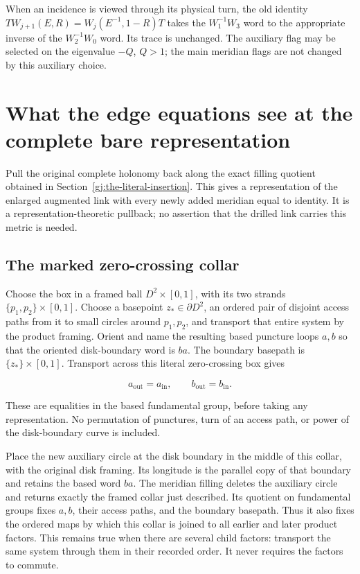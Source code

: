 When an incidence is viewed through its physical turn, the old identity
\(T W_{j+1}(E,R)=W_j(E^{-1},1-R)T\)
takes the \(W_1^{-1}W_3\) word to the appropriate inverse of the \(W_2^{-1}W_0\) word. Its trace is unchanged. The auxiliary flag may be selected on the eigenvalue \(-Q\), \(Q>1\); the main meridian flags are not changed by this auxiliary choice.

\section{What the edge equations see at the complete bare representation}\label{gj:what-the-edge-equations-see-at-the-complete-bare-representation}

Pull the original complete holonomy back along the exact filling quotient obtained in Section~\ref{gj:the-literal-insertion}. This gives a representation of the enlarged augmented link with every newly added meridian equal to identity. It is a representation-theoretic pullback; no assertion that the drilled link carries this metric is needed.

\subsection{The marked zero-crossing collar}\label{gj:the-marked-zero-crossing-collar}

Choose the box in a framed ball \(D^2\times[0,1]\), with its two strands
\(\{p_1,p_2\}\times[0,1]\). Choose a basepoint \(z_*\in\partial D^2\),
an ordered pair of disjoint access paths from it to small circles around
\(p_1,p_2\), and transport that entire system by the product framing.
Orient and name the resulting based puncture loops \(a,b\) so that
the oriented disk-boundary word is \(ba\). The boundary basepath is
\(\{z_*\}\times[0,1]\). Transport across this literal zero-crossing box gives

\begin{equation}\label{gj:22c}
a_{\mathrm{out}}=a_{\mathrm{in}},\qquad
                        b_{\mathrm{out}}=b_{\mathrm{in}}.
\end{equation}

These are equalities in the based fundamental group, before taking any
representation. No permutation of punctures, turn of an access path,
or power of the disk-boundary curve is included.

Place the new auxiliary circle at the disk boundary in the middle
of this collar, with the original disk framing. Its longitude is
the parallel copy of that boundary and retains the based word \(ba\).
The meridian filling deletes the auxiliary circle and returns exactly
the framed collar just described. Its quotient on fundamental groups
fixes \(a,b\), their access paths, and the boundary basepath. Thus it
also fixes the ordered maps by which this collar is joined to all
earlier and later product factors. This remains true when there are
several child factors: transport the same system through them in
their recorded order. It never requires the factors to commute.

